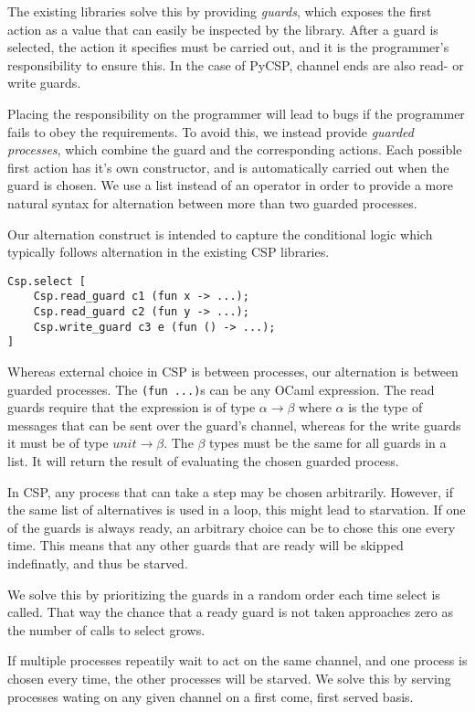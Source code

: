 \documentclass[a4paper,12pt]{article}
\begin{document}
The existing libraries solve this by providing \emph{guards}, which exposes the first action as a value 
that can easily be inspected by the library. After a guard is selected, the action it specifies must be 
carried out, and it is the programmer's responsibility to ensure this. In the case of PyCSP, channel
ends are also read- or write guards. 

Placing the responsibility on the programmer will lead to bugs if the programmer fails to obey the 
requirements. To avoid this, we instead provide \emph{guarded processes}, which combine the guard and
the corresponding actions. Each possible first action has it's own constructor, and is automatically 
carried out when the guard is chosen. We use a list instead of an operator in order to provide a more 
natural syntax for alternation between more than two guarded processes.

Our alternation construct is intended to capture the conditional logic which typically follows 
alternation in the existing CSP libraries.

\begin{verbatim}
Csp.select [
    Csp.read_guard c1 (fun x -> ...);
    Csp.read_guard c2 (fun y -> ...);
    Csp.write_guard c3 e (fun () -> ...);
]
\end{verbatim}


Whereas external choice in CSP is between processes, our alternation is between guarded processes.
The \verb|(fun ...)|s can be any OCaml expression. The read guards require that the expression is of type
$\alpha \to \beta$ where $\alpha$ is the type of messages that can be sent over the guard's channel, whereas
for the write guards it must be of type $unit \to \beta$. The $\beta$ types must be the same for all guards in 
a list. It will return the result of evaluating the chosen guarded process.

In CSP, any process that can take a step may be chosen arbitrarily. However, if the same list of 
alternatives is used in a loop, this might lead to starvation. If one of the guards is always ready,
an arbitrary choice can be to chose this one every time. This means that any other guards that are 
ready will be skipped indefinatly, and thus be starved.

We solve this by prioritizing the guards in a random order each time select is called. That way the
chance that a ready guard is not taken approaches zero as the number of calls to select grows.

If multiple processes repeatily wait to act on the same channel, and one process is chosen every time,
the other processes will be starved. We solve this by serving processes wating on any given channel
on a first come, first served basis.
\end{document}

